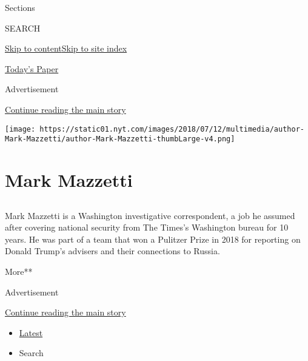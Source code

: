 Sections

SEARCH

\protect\hyperlink{site-content}{Skip to
content}\protect\hyperlink{site-index}{Skip to site index}

\href{https://myaccount.nytimes.com/auth/login?response_type=cookie\&client_id=vi}{}

\href{https://www.nytimes.com/section/todayspaper}{Today's Paper}

Advertisement

\protect\hyperlink{after-top}{Continue reading the main story}

\texttt{[image: https://static01.nyt.com/images/2018/07/12/multimedia/author-Mark-Mazzetti/author-Mark-Mazzetti-thumbLarge-v4.png]}

\hypertarget{mark-mazzetti}{%
\section{Mark Mazzetti}\label{mark-mazzetti}}

\subsection{}

Mark Mazzetti is a Washington investigative correspondent, a job he
assumed after covering national security from The Times's Washington
bureau for 10 years. He was part of a team that won a Pulitzer Prize in
2018 for reporting on Donald Trump's advisers and their connections to
Russia.

More**

Advertisement

\protect\hyperlink{after-mid1}{Continue reading the main story}

\begin{itemize}
\tightlist
\item
  \protect\hyperlink{stream-panel}{Latest}
\item
  Search
\end{itemize}


